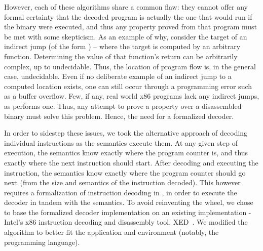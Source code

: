 However, each of these algorithms share a common flaw: they cannot offer any formal certainty that the decoded program is actually the one that would run if the binary were executed, and thus any property proved from that program must be met with some skepticism.  As an example of why, consider the target of an indirect jump (of the form ) – where the target is computed by an arbitrary function.  Determining the value of that function’s return can be arbitrarily complex, up to undecidable.  Thus, the location of program flow is, in the general case, undecidable.  Even if no deliberate example of an indirect jump to a computed location exists, one can still occur through a programming error such as a buffer overflow.  Few, if any, real world x86 programs lack any indirect jumps, as  performs one.  Thus, any attempt to prove a property over a disassembled binary must solve this problem.  Hence, the need for a formalized decoder.

In order to sidestep these issues, we took the alternative approach of decoding individual instructions as the semantics execute them.  At any given step of execution, the semantics know exactly where the program counter is, and thus exactly where the next instruction should start.  After decoding and executing the instruction, the semantics know exactly where the program counter should go next (from the size and semantics of the instruction decoded).  This however requires a formalization of instruction decoding in \K, in order to execute the decoder in tandem with the semantics.  To avoid reinventing the wheel, we chose to base the formalized decoder implementation on an existing implementation - Intel’s x86 instruction decoding and disassembly tool, XED~\cite{xed}.  We modified the algorithm to better fit the application and environment (notably, the \K programming language). 

